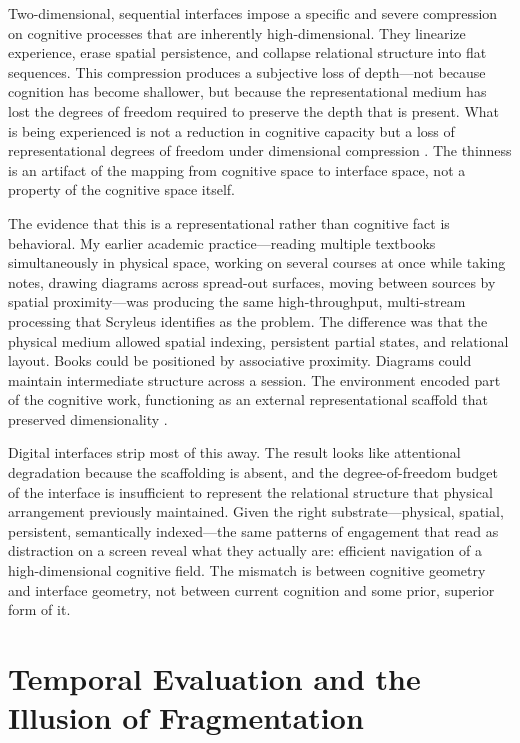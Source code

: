 \documentclass[12pt, a4paper]{article}
\begin{document}
Two-dimensional, sequential interfaces impose a specific and severe compression on cognitive processes that are inherently high-dimensional. They linearize experience, erase spatial persistence, and collapse relational structure into flat sequences. This compression produces a subjective loss of depth---not because cognition has become shallower, but because the representational medium has lost the degrees of freedom required to preserve the depth that is present. What is being experienced is not a reduction in cognitive capacity but a loss of representational degrees of freedom under dimensional compression \cite{Landauer1961,Jaynes1957}. The thinness is an artifact of the mapping from cognitive space to interface space, not a property of the cognitive space itself.

The evidence that this is a representational rather than cognitive fact is behavioral. My earlier academic practice---reading multiple textbooks simultaneously in physical space, working on several courses at once while taking notes, drawing diagrams across spread-out surfaces, moving between sources by spatial proximity---was producing the same high-throughput, multi-stream processing that Scryleus identifies as the problem. The difference was that the physical medium allowed spatial indexing, persistent partial states, and relational layout. Books could be positioned by associative proximity. Diagrams could maintain intermediate structure across a session. The environment encoded part of the cognitive work, functioning as an external representational scaffold that preserved dimensionality \cite{Hutchins1995}.

Digital interfaces strip most of this away. The result looks like attentional degradation because the scaffolding is absent, and the degree-of-freedom budget of the interface is insufficient to represent the relational structure that physical arrangement previously maintained. Given the right substrate---physical, spatial, persistent, semantically indexed---the same patterns of engagement that read as distraction on a screen reveal what they actually are: efficient navigation of a high-dimensional cognitive field. The mismatch is between cognitive geometry and interface geometry, not between current cognition and some prior, superior form of it.

\section{Temporal Evaluation and the Illusion of Fragmentation}
\end{document}

